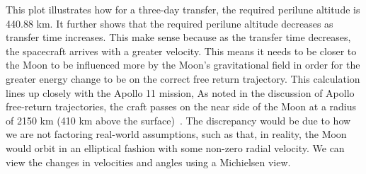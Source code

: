 \documentclass[12pt,twocolumn]{article}  %
\begin{document}
\indent This plot illustrates how for a three-day transfer, the required perilune altitude 
is 440.88 km. It further shows that the required perilune altitude 
decreases as transfer time increases. This make sense 
because as the transfer time decreases, the 
spacecraft arrives with a greater velocity. This means it needs to be
closer to the Moon to be influenced more by the 
Moon's gravitational field in order for the greater energy change to be on the correct
free return trajectory. This calculation lines up 
closely with the Apollo 11 mission, As noted in the discussion of 
Apollo free-return trajectories, the craft passes on the 
near side of the Moon at a radius of 2150 km (410 km above the surface)~\cite{wiki:free-return}.
The discrepancy would be due to 
how we are not factoring real-world assumptions, such as that, in reality, the Moon
would orbit in an elliptical fashion with some non-zero radial velocity.
We can view the changes in velocities and angles using a Michielsen view. 


\begin{adjustwidth}{-0.3cm}{0cm}


\end{adjustwidth}
\end{document}
